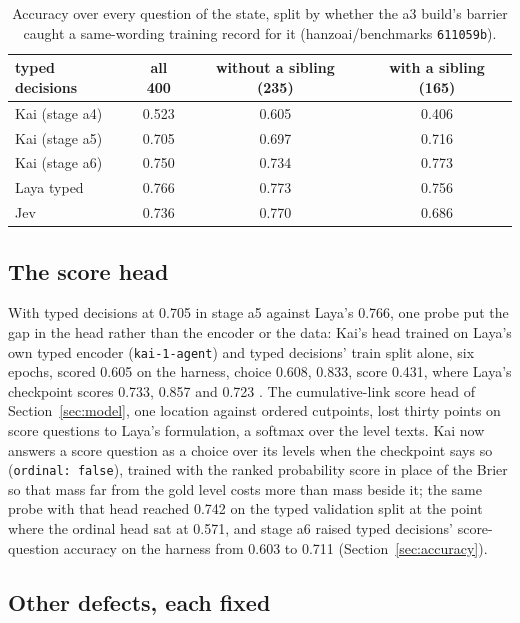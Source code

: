 \begin{table}[h]
  \centering
  \small
  \begin{tabular}{lccc}
    \toprule
    typed decisions & all 400 & without a sibling (235) & with a sibling (165) \\
    \midrule
    Kai (stage a4) & 0.523 & 0.605 & 0.406 \\
    Kai (stage a5) & 0.705 & 0.697 & 0.716 \\
    Kai (stage a6) & 0.750 & 0.734 & 0.773 \\
    Laya typed & 0.766 & 0.773 & 0.756 \\
    Jev & 0.736 & 0.770 & 0.686 \\
    \bottomrule
  \end{tabular}
  \caption{Accuracy over every question of the state, split by whether the
    a3 build's barrier caught a same-wording training record for it
    (hanzoai/benchmarks \texttt{611059b}).}
  \label{tab:siblings}
\end{table}

\subsection{The score head}
\label{sec:score}

With typed decisions at 0.705 in stage a5 against Laya's 0.766, one probe put
the gap in the head rather than the encoder or the data: Kai's head trained on
Laya's own typed encoder (\texttt{kai-1-agent}) and typed decisions' train
split alone, six epochs, scored 0.605 on the harness, choice 0.608, 
0.833, score 0.431, where Laya's checkpoint scores 0.733, 0.857 and 0.723
\meas. The cumulative-link score head of Section~\ref{sec:model}, one location
against ordered cutpoints, lost thirty points on score questions to Laya's
formulation, a softmax over the level texts. Kai now answers a score question as
a choice over its levels when the checkpoint says so (\texttt{ordinal: false}),
trained with the ranked probability score in place of the Brier so that mass
far from the gold level costs more than mass beside it; the same probe with
that head reached 0.742 on the typed validation split at the point where the
ordinal head sat at 0.571, and stage a6 raised typed decisions' score-question
accuracy on the harness from 0.603 to 0.711 (Section~\ref{sec:accuracy}).

\subsection{Other defects, each fixed}
\label{sec:other}


